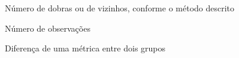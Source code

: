 \begin{simbolos}
  \item[$k$] Número de dobras ou de vizinhos, conforme o método descrito
  \item[$n$] Número de observações
  \item[$\Delta$] Diferença de uma métrica entre dois grupos
\end{simbolos}
